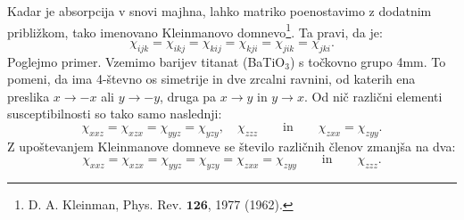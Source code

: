 Kadar je absorpcija v snovi majhna, lahko matriko poenostavimo
z dodatnim približkom, tako imenovano  
 Kleinmanovo domnevo\footnote{D. A. Kleinman, Phys. Rev. $\mathbf{126}$, 1977 (1962).}.
Ta pravi, da je:
\begin{equation}
\chi_{ijk} = \chi_{ikj} = \chi_{kij} = \chi_{kji} = \chi_{jik} = \chi_{jki}.
\label{Klein}
\end{equation}
Poglejmo primer. 
Vzemimo barijev titanat (BaTiO$_3$) s točkovno grupo 4mm. To pomeni, da
ima 4-števno os simetrije in dve zrcalni ravnini, od katerih ena preslika $x \to -x$ ali $y \to -y$, 
druga pa $x\to y$ in $y\to x$. Od nič različni elementi susceptibilnosti so tako samo
naslednji:
\begin{equation}
\chi_{xxz} = \chi_{xzx} =   \chi_{yyz} = \chi_{yzy}, \quad  \chi_{zzz} \qquad \mathrm{in} 
\qquad \chi_{zxx} = \chi_{zyy}.   
\end{equation}
Z upoštevanjem Kleinmanove domneve se število različnih členov zmanjša na dva:
\begin{equation}
\chi_{xxz} = \chi_{xzx} = \chi_{yyz} = \chi_{yzy} =\chi_{zxx} = \chi_{zyy} \qquad \mathrm{in} \qquad \chi_{zzz}.   
\end{equation}
